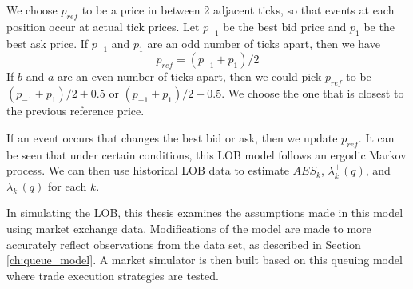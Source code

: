 We choose $p_{ref}$ to be a price in between 2 adjacent ticks, so that events at each position occur at actual tick prices. Let $p_{-1}$ be the best bid price and $p_1$ be the best ask price. If $p_{-1}$ and $p_1$ are an odd number of ticks apart, then we have 
$$p_{ref}=  (p_{-1}+p_1)/2$$
If $b$ and $a$ are an even number of ticks apart, then we could pick $p_{ref}$ to be $(p_{-1}+p_1)/2 + 0.5$ or $(p_{-1}+p_1)/2 - 0.5$. We choose the one that is closest to the previous reference price.

If an event occurs that changes the best bid or ask, then we update $p_{ref}$. It can be seen that under certain conditions, this LOB model follows an ergodic Markov process. We can then use historical LOB data to estimate $AES_k$, $\lambda^+_k(q)$, and $\lambda^-_k(q)$ for each $k$.

In simulating the LOB, this thesis examines the assumptions made in this model using market exchange data. Modifications of the model are made to more accurately reflect observations from the data set, as described in Section \ref{ch:queue_model}. A market simulator is then built based on this queuing model where trade execution strategies are tested.